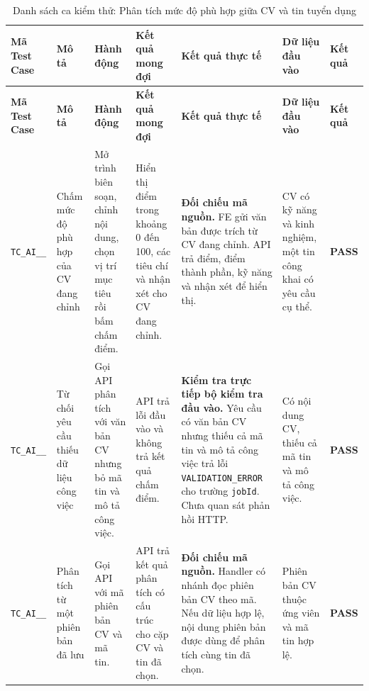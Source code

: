 \begin{landscape}
{
\fontsize{9.5}{11.5}\selectfont
\setlength{\tabcolsep}{3pt}
\renewcommand{\arraystretch}{1.2}
\begin{longtable}{|>{\raggedright\arraybackslash}p{2.1cm}|>{\raggedright\arraybackslash}p{2.8cm}|>{\raggedright\arraybackslash}p{3.8cm}|>{\raggedright\arraybackslash}p{4.0cm}|>{\raggedright\arraybackslash}p{5.0cm}|>{\raggedright\arraybackslash}p{3.2cm}|>{\centering\arraybackslash}p{1.3cm}|}
    \caption{Danh sách ca kiểm thử: Phân tích mức độ phù hợp giữa CV và tin tuyển dụng} \label{tab:ts-ai-01} \\
    \hline
    \textbf{Mã Test Case} & \textbf{Mô tả} & \textbf{Hành động} & \textbf{Kết quả mong đợi} & \textbf{Kết quả thực tế} & \textbf{Dữ liệu đầu vào} & \textbf{Kết quả} \\
    \hline
    \endfirsthead
    \hline
    \textbf{Mã Test Case} & \textbf{Mô tả} & \textbf{Hành động} & \textbf{Kết quả mong đợi} & \textbf{Kết quả thực tế} & \textbf{Dữ liệu đầu vào} & \textbf{Kết quả} \\
    \hline
    \endhead
    \hline
    \endfoot
    \hline
    \endlastfoot
    \texttt{TC\_\allowbreak AI\_\allowbreak 01\_\allowbreak 01} & Chấm mức độ phù hợp của CV đang chỉnh & Mở trình biên soạn, chỉnh nội dung, chọn vị trí mục tiêu rồi bấm chấm điểm. & Hiển thị điểm trong khoảng 0 đến 100, các tiêu chí và nhận xét cho CV đang chỉnh. & \textbf{Đối chiếu mã nguồn.} FE gửi văn bản được trích từ CV đang chỉnh. API trả điểm, điểm thành phần, kỹ năng và nhận xét để hiển thị. & CV có kỹ năng và kinh nghiệm, một tin công khai có yêu cầu cụ thể. & \textbf{PASS} \\
    \hline
    \texttt{TC\_\allowbreak AI\_\allowbreak 01\_\allowbreak 02} & Từ chối yêu cầu thiếu dữ liệu công việc & Gọi API phân tích với văn bản CV nhưng bỏ mã tin và mô tả công việc. & API trả lỗi đầu vào và không trả kết quả chấm điểm. & \textbf{Kiểm tra trực tiếp bộ kiểm tra đầu vào.} Yêu cầu có văn bản CV nhưng thiếu cả mã tin và mô tả công việc trả lỗi \texttt{VALIDATION\_\allowbreak ERROR} cho trường \texttt{jobId}. Chưa quan sát phản hồi HTTP. & Có nội dung CV, thiếu cả mã tin và mô tả công việc. & \textbf{PASS} \\
    \hline
    \texttt{TC\_\allowbreak AI\_\allowbreak 01\_\allowbreak 03} & Phân tích từ một phiên bản đã lưu & Gọi API với mã phiên bản CV và mã tin. & API trả kết quả phân tích có cấu trúc cho cặp CV và tin đã chọn. & \textbf{Đối chiếu mã nguồn.} Handler có nhánh đọc phiên bản CV theo mã. Nếu dữ liệu hợp lệ, nội dung phiên bản được dùng để phân tích cùng tin đã chọn. & Phiên bản CV thuộc ứng viên và mã tin hợp lệ. & \textbf{PASS} \\

\end{longtable}}
\end{landscape}
